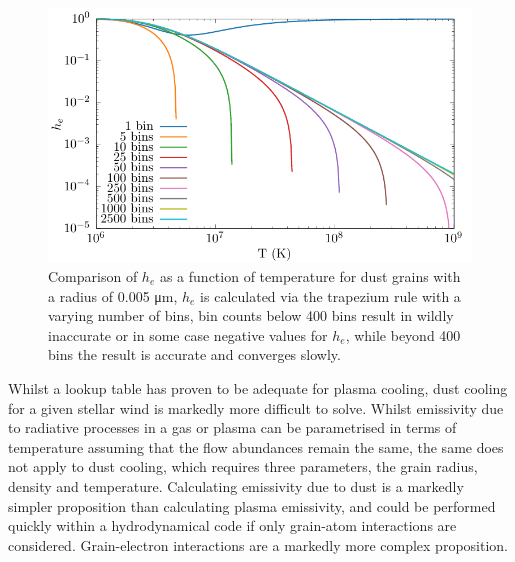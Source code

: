 \begin{figure}
  \centering
  \includegraphics{assets/he_accuracy/he_acc.pdf}
  \caption[$h_e$ integration accuracy comparison]{Comparison of $h_e$ as a function of temperature for dust grains with a radius of 0.005 \si{\micro\metre}, $h_e$ is calculated via the trapezium rule with a varying number of bins, bin counts below 400 bins result in wildly inaccurate or in some case negative values for $h_e$, while beyond 400 bins the result is accurate and converges slowly.}
  \label{fig:he-accuracy-bins}
\end{figure}

Whilst a lookup table has proven to be adequate for plasma cooling, dust cooling for a given stellar wind is markedly more difficult to solve.
Whilst emissivity due to radiative processes in a gas or plasma can be parametrised in terms of temperature assuming that the flow abundances remain the same, the same does not apply to dust cooling, which requires three parameters, the grain radius, density and temperature.
Calculating emissivity due to dust is a markedly simpler proposition than calculating plasma emissivity, and could be performed quickly within a hydrodynamical code if only grain-atom interactions are considered.
Grain-electron interactions are a markedly more complex proposition.

